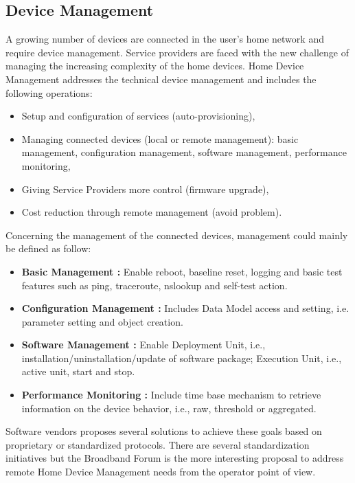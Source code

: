 \subsection{Device Management}
A growing number of devices are connected in the user's home network and require device management. Service providers are faced with the new challenge of managing the increasing complexity of the home devices. Home Device Management addresses the technical device management and includes the following operations:
\begin{itemize}
  \it
  \item Setup and configuration of services (auto-provisioning),
  \item Managing connected devices (local or remote management): basic management, configuration management, software management, performance monitoring,
  \item Giving Service Providers more control (firmware upgrade),
	\item Cost reduction through remote management (avoid problem).
\end{itemize}
Concerning the management of the connected devices, management could mainly be defined as follow:
\begin{itemize}
  \it
  \item \textbf{Basic Management :} Enable reboot, baseline reset, logging and basic test features such as ping, traceroute, nslookup and self-test action.
  \item \textbf{Configuration Management :} Includes Data Model access and setting, i.e. parameter setting and object creation.
  \item \textbf{Software Management :} Enable Deployment Unit, i.e., installation/uninstallation/update of software package; Execution Unit, i.e., active unit, start and stop.
	\item \textbf{Performance Monitoring :} Include time base mechanism to retrieve information on the device behavior, i.e., raw, threshold or aggregated.
\end{itemize}
Software vendors proposes several solutions to achieve these goals based on proprietary or standardized protocols. There are several standardization initiatives but the Broadband Forum is the more interesting proposal to address remote Home Device Management needs from the operator point of view.



